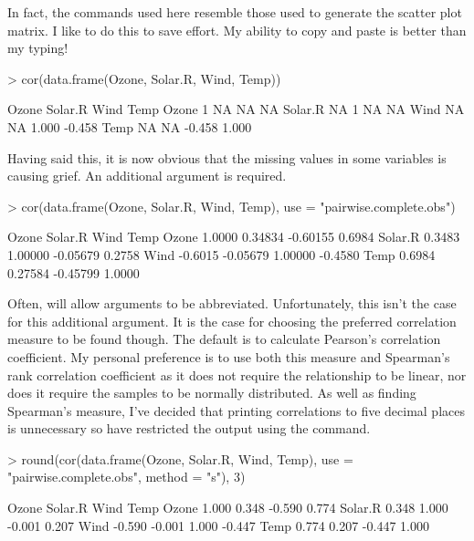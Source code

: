In fact, the commands used here resemble those used to generate the scatter plot matrix. I like to do this to save effort. My ability to copy and paste is better than my typing! 

\begin{Schunk}
\begin{Sinput}
> cor(data.frame(Ozone, Solar.R, Wind, Temp)) 
\end{Sinput}
\begin{Soutput}
        Ozone Solar.R   Wind   Temp
Ozone       1      NA     NA     NA
Solar.R    NA       1     NA     NA
Wind       NA      NA  1.000 -0.458
Temp       NA      NA -0.458  1.000
\end{Soutput}
\end{Schunk}

Having said this, it is now obvious that the missing values in some variables is causing grief. An additional argument is required. 

\begin{Schunk}
\begin{Sinput}
> cor(data.frame(Ozone, Solar.R, Wind, Temp),  
   use = "pairwise.complete.obs") 
\end{Sinput}
\begin{Soutput}
          Ozone  Solar.R     Wind    Temp
Ozone    1.0000  0.34834 -0.60155  0.6984
Solar.R  0.3483  1.00000 -0.05679  0.2758
Wind    -0.6015 -0.05679  1.00000 -0.4580
Temp     0.6984  0.27584 -0.45799  1.0000
\end{Soutput}
\end{Schunk}

Often, \R{} will allow arguments to be abbreviated. Unfortunately, this isn't the case for this additional argument. It is the case for choosing the preferred correlation measure to be found though. The default is to calculate Pearson's correlation coefficient. My personal preference is to use both this measure and Spearman's rank correlation coefficient as it does not require the relationship to be linear, nor does it require the samples to be normally distributed. As well as finding Spearman's measure, I've decided that printing correlations to five decimal places is unnecessary so have restricted the output using the  command. 

\begin{Schunk}
\begin{Sinput}
> round(cor(data.frame(Ozone, Solar.R, Wind, Temp),  
   use = "pairwise.complete.obs", method = "s"), 3) 
\end{Sinput}
\begin{Soutput}
         Ozone Solar.R   Wind   Temp
Ozone    1.000   0.348 -0.590  0.774
Solar.R  0.348   1.000 -0.001  0.207
Wind    -0.590  -0.001  1.000 -0.447
Temp     0.774   0.207 -0.447  1.000
\end{Soutput}
\end{Schunk}


